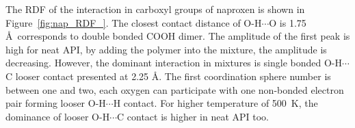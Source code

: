 The RDF of the interaction in carboxyl groups of naproxen is shown in Figure~\ref{fig:nap_RDF_}. The closest contact distance of O-H$\cdots$O is 1.75 \AA~corresponds to double bonded COOH dimer. The amplitude of the first peak is high for neat API, by adding the polymer into the mixture, the amplitude is decreasing. However, the dominant interaction in mixtures is single bonded O-H$\cdots$C looser contact presented at 2.25 \AA. The first coordination sphere number is between one and two, each oxygen can participate with one non-bonded electron pair forming looser O-H$\cdots$H contact. For higher temperature of 500~K, the dominance of looser O-H$\cdots$C contact is higher in neat API too.


\newpage
\begin{figure}[H]
	\centering
	\\

\end{figure}
